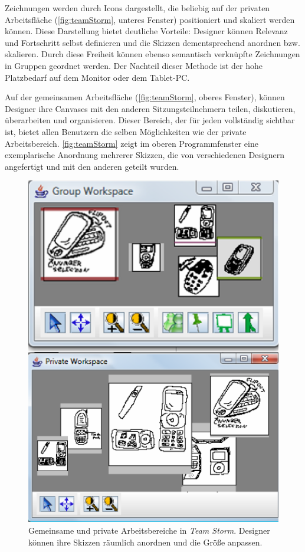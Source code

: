 Zeichnungen werden durch Icons dargestellt, die beliebig auf der privaten Arbeitsfläche (\autoref{fig:teamStorm}, unteres Fenster) positioniert und skaliert werden können. Diese Darstellung bietet deutliche Vorteile: Designer können Relevanz und Fortschritt selbst definieren und die Skizzen dementsprechend anordnen bzw. skalieren. Durch diese Freiheit können ebenso semantisch verknüpfte Zeichnungen in Gruppen geordnet werden. Der Nachteil dieser Methode ist der hohe Platzbedarf auf dem Monitor oder dem Tablet-PC.

Auf der gemeinsamen Arbeitsfläche (\autoref{fig:teamStorm}, oberes Fenster), können Designer ihre Canvases mit den anderen Sitzungsteilnehmern teilen, diskutieren, überarbeiten und organisieren. Dieser Bereich, der für jeden vollständig sichtbar ist, bietet allen Benutzern die selben Möglichkeiten wie der private Arbeitsbereich. \autoref{fig:teamStorm} zeigt im oberen Programmfenster eine exemplarische Anordnung mehrerer Skizzen, die von verschiedenen Designern angefertigt und mit den anderen geteilt wurden. 

\begin{figure}[bth]
	\includegraphics[width=\linewidth]{gfx/teamStormPrivateWorkspace.png}
	\caption[Gemeinsame und private Arbeitsfläche in \emph{Team Storm} \newline \citep{Hailpern:2007p113}]{Gemeinsame und private Arbeitsbereiche in \emph{Team Storm}. Designer können ihre Skizzen räumlich anordnen und die Größe anpassen.}
	\label{fig:teamStorm}
\end{figure}

